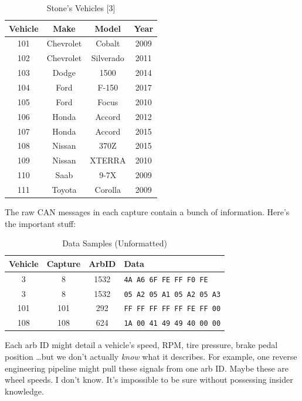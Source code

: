 \documentclass[10pt]{article}
\newcommand{\newpar}{\medskip \noindent}
\begin{document}
\begin{table}
    \caption*{Stone's Vehicles [3]}
    \centering
    \begin{tabular}{|c|c|c|c|}
    \hline
    \textbf{Vehicle} & \textbf{Make} & \textbf{Model} & \textbf{Year} \\
    \hline
    101 & Chevrolet & Cobalt    & 2009 \\
    102 & Chevrolet & Silverado & 2011 \\
    103 & Dodge     & 1500      & 2014 \\
    104 & Ford      & F-150     & 2017 \\
    105 & Ford      & Focus     & 2010 \\
    106 & Honda     & Accord    & 2012 \\
    107 & Honda     & Accord    & 2015 \\
    108 & Nissan    & 370Z      & 2015 \\
    109 & Nissan    & XTERRA    & 2010 \\
    110 & Saab      & 9-7X      & 2009 \\
    111 & Toyota    & Corolla   & 2009 \\
    \hline
    \end{tabular}
\end{table}

\newpar The raw CAN messages in each capture contain a bunch of information. Here's the important stuff:

\begin{table}
    \caption*{Data Samples (Unformatted)}
    \centering
    \begin{tabular}{|c|c|c|l|}
    \hline
    \textbf{Vehicle} & \textbf{Capture} & \textbf{ArbID} & \textbf{Data} \\
    \hline
    3   & 8   & 1532 & \texttt{4A A6 6F FE FF F0 FE}    \\
    3   & 8   & 1532 & \texttt{05 A2 05 A1 05 A2 05 A3} \\
    101 & 101 & 292  & \texttt{FF FF FF FF FF FE FF 00} \\
    108 & 108 & 624  & \texttt{1A 00 41 49 49 40 00 00} \\
    \hline
    \end{tabular}
\end{table}

\newpar Each arb ID might detail a vehicle's speed, RPM, tire pressure, brake pedal position \ldots but we don't actually \textit{know} what it describes. For example, one reverse engineering pipeline might pull these signals from one arb ID. Maybe these are wheel speeds. I don't know. It's impossible to be sure without possessing insider knowledge.
\end{document}
